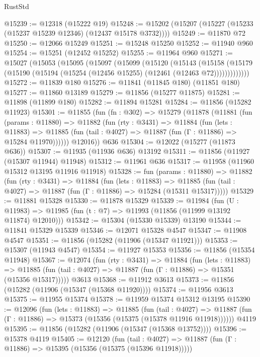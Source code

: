 \begin{lexlean}{RustStd}
\begin{coremodule}
@15239 := @12318 (@15222 @19)
@15248 := @15202 (@15207 (@15227 (@15233 (@15237 @15239 @12346) (@12437 @15178 @3732))))
@15249 := @11870 @72
@15250 := @12066 @15249
@15251 := @15248 @15250
@15252 := @11940 @960
@15254 := @15251 (@12452 @15252)
@15255 := @11964 @960
@15271 := @15027
    (@15053
      (@15095
        (@15097
          (@15099
            (@15120
              (@15143
                (@15158
                  (@15179 (@15190 (@15194 (@15254 (@12456 @15255) (@12461 (@12463 @72)))))))))))))
@15272 := @11839 @180
@15276 := @11841 (@11845 @180) (@11851 @180)
@15277 := @11860 @13189
@15279 := @11856 (@15277 @11875)
@15281 := @11898 (@11899 @180)
@15282 := @11894 @15281
@15284 := @11856 (@15282 @11923)
@15301 := @11855
    (fun (fn : @302) =>
    @15279
      (@11878
        (@11881
          (fun (params : @11880) =>
          @11882
            (fun (rty : @3431) =>
            @11884
              (fun (lets : @11883) =>
              @11885 (fun (tail : @4027) => @11887 (fun (Γ : @11886) => @15284 @11970))))))
        @12016))
    @636
@15304 := @12022 (@15277 (@11873 @636))
@15307 := @11935 (@11936 @636) @13192
@15311 := @11856 (@11927 (@15307 @11944) @11948)
@15312 := @11961 @636
@15317 := @11958 (@11960 @15312 @13195 @11916 @11918)
@15328 := fun (params : @11880) =>
  @11882
    (fun (rty : @3431) =>
    @11884
      (fun (lets : @11883) =>
      @11885 (fun (tail : @4027) => @11887 (fun (Γ : @11886) => @15284 (@15311 @15317)))))
@15329 := @11881 @15328
@15330 := @11878 @15329
@15339 := @11984
    (fun (U : @11983) => @11985 (fun (t : @7) => @11993 (@11856 (@11999 @13192 @11874) @12010)))
@15342 := @15304 (@15330 @15339) @13190
@15344 := @11841 @15329 @15339
@15346 := @12071 @15328 @4547
@15347 := @11908 @4547
@15351 := @11856 (@15282 (@11906 (@15347 @11921)))
@15353 := @15307 (@11943 @4547)
@15354 := @11927 @15353
@15356 := @11856 (@15354 @11948)
@15367 := @12074
    (fun (rty : @3431) =>
    @11884
      (fun (lets : @11883) =>
      @11885 (fun (tail : @4027) => @11887 (fun (Γ : @11886) => @15351 (@15356 @15317)))))
    @3613
@15368 := @11912 @3613
@15373 := @11856 (@15282 (@11906 (@15347 (@15368 @11920))))
@15374 := @11956 @3613
@15375 := @11955 @15374
@15378 := @11959 @15374 @15312 @13195
@15390 := @12096
    (fun (lets : @11883) =>
    @11885
      (fun (tail : @4027) =>
      @11887 (fun (Γ : @11886) => @15373 (@15356 (@15375 (@15378 @11916 @11918))))))
    @4119
@15395 := @11856 (@15282 (@11906 (@15347 (@15368 @13752))))
@15396 := @15378 @4119
@15405 := @12120
    (fun (tail : @4027) => @11887 (fun (Γ : @11886) => @15395 (@15356 (@15375 (@15396 @11918)))))

\end{coremodule}
\end{lexlean}
